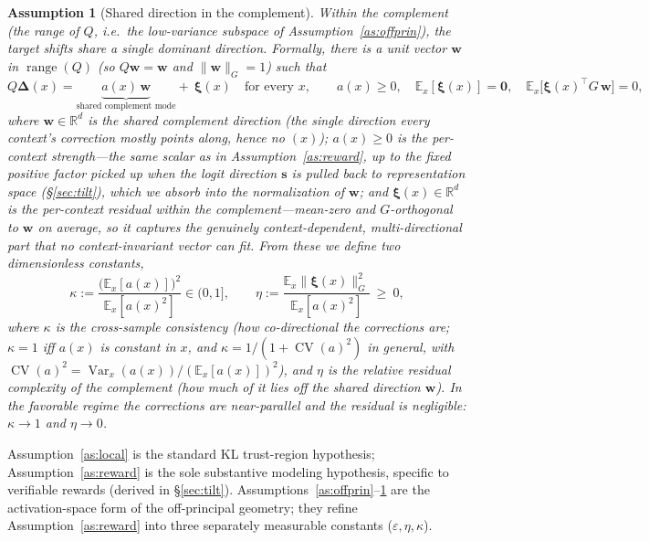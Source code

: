 \documentclass[11pt]{article}
\newtheorem{assumption}{Assumption}[section]
\DeclareMathOperator{\CV}{CV}
\DeclareMathOperator{\Var}{Var}
\newcommand{\R}{\mathbb{R}}
\newcommand{\E}{\mathbb{E}}
\newcommand{\bs}{\mathbf{s}}
\newcommand{\bw}{\mathbf{w}}
\newcommand{\bDelta}{\bm{\Delta}}
\newcommand{\bxi}{\bm{\xi}}
\newcommand{\Gnorm}[1]{\lVert #1\rVert_G}
\begin{document}
\begin{assumption}[Shared direction in the complement]\label{as:shared}
Within the complement (the range of $Q$, i.e.\ the low-variance subspace of
Assumption~\ref{as:offprin}), the target shifts share a single dominant direction. Formally, there
is a unit vector $\bw$ in $\operatorname{range}(Q)$ (so $Q\bw=\bw$ and $\Gnorm{\bw}=1$) such that
\begin{equation*}
Q\bDelta(x)=\underbrace{a(x)\,\bw}_{\text{shared complement mode}}+\ \bxi(x)
\quad\text{for every }x,
\qquad a(x)\ge0,\quad \E_x[\bxi(x)]=\mathbf 0,\quad \E_x\!\big[\bxi(x)^\top G\,\bw\big]=0 ,
\end{equation*}
where $\bw\in\R^d$ is the \emph{shared complement direction} (the single direction every context's
correction mostly points along, hence no $(x)$); $a(x)\ge0$ is the per-context strength---the same
scalar as in Assumption~\ref{as:reward}, up to the fixed positive factor picked up when the logit
direction $\bs$ is pulled back to representation space (\S\ref{sec:tilt}), which we absorb into the
normalization of $\bw$; and $\bxi(x)\in\R^d$ is the \emph{per-context residual within the
complement}---mean-zero and $G$-orthogonal to $\bw$ on average, so it captures the genuinely
context-dependent, multi-directional part that no context-invariant vector can fit. From these we
define two dimensionless constants,
\begin{equation*}
\kappa:=\frac{\big(\E_x[a(x)]\big)^2}{\E_x[a(x)^2]}\in(0,1],
\qquad
\eta:=\frac{\E_x\Gnorm{\bxi(x)}^2}{\E_x[a(x)^2]}\ \ge\ 0 ,
\end{equation*}
where $\kappa$ is the \emph{cross-sample consistency} (how co-directional the corrections are;
$\kappa=1$ iff $a(x)$ is constant in $x$, and $\kappa=1/(1+\CV(a)^2)$ in general, with
$\CV(a)^2=\Var_x(a(x))/(\E_x[a(x)])^2$), and $\eta$ is the \emph{relative residual complexity} of
the complement (how much of it lies off the shared direction $\bw$). In the favorable regime the
corrections are near-parallel and the residual is negligible: $\kappa\to1$ and $\eta\to0$.
\end{assumption}

\noindent
Assumption~\ref{as:local} is the standard KL trust-region hypothesis;
Assumption~\ref{as:reward} is the sole substantive modeling hypothesis, specific to verifiable
rewards (derived in \S\ref{sec:tilt}). Assumptions~\ref{as:offprin}--\ref{as:shared} are the
activation-space form of the off-principal geometry; they refine Assumption~\ref{as:reward} into
three separately measurable constants ($\varepsilon,\eta,\kappa$).
\end{document}
